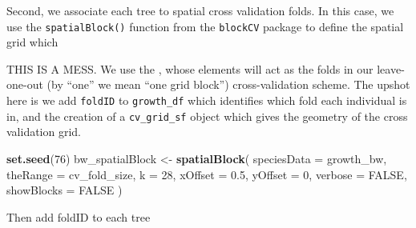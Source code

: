 \documentclass[12pt]{article}
\newenvironment{Shaded}{\begin{snugshade}}{\end{snugshade}}
\newcommand{\CommentTok}[1]{\textcolor[rgb]{0.56,0.35,0.01}{\textit{#1}}}
\newcommand{\DataTypeTok}[1]{\textcolor[rgb]{0.13,0.29,0.53}{#1}}
\newcommand{\DecValTok}[1]{\textcolor[rgb]{0.00,0.00,0.81}{#1}}
\newcommand{\FloatTok}[1]{\textcolor[rgb]{0.00,0.00,0.81}{#1}}
\newcommand{\KeywordTok}[1]{\textcolor[rgb]{0.13,0.29,0.53}{\textbf{#1}}}
\newcommand{\NormalTok}[1]{#1}
\newcommand{\OperatorTok}[1]{\textcolor[rgb]{0.81,0.36,0.00}{\textbf{#1}}}
\newcommand{\OtherTok}[1]{\textcolor[rgb]{0.56,0.35,0.01}{#1}}
\newcommand{\StringTok}[1]{\textcolor[rgb]{0.31,0.60,0.02}{#1}}
\begin{document}
Second, we associate each tree to spatial cross validation folds. In
this case, we use the \texttt{spatialBlock()} function from the
\texttt{blockCV} package to define the spatial grid which

THIS IS A MESS. We use the \citet{valavi_blockcv_2019}, whose elements
will act as the folds in our leave-one-out (by ``one'' we mean ``one
grid block'') cross-validation scheme. The upshot here is we add
\texttt{foldID} to \texttt{growth\_df} which identifies which fold each
individual is in, and the creation of a \texttt{cv\_grid\_sf} object
which gives the geometry of the cross validation grid.

\begin{Shaded}
\begin{Highlighting}[]
\KeywordTok{set.seed}\NormalTok{(}\DecValTok{76}\NormalTok{)}
\NormalTok{bw_spatialBlock <-}\StringTok{ }\KeywordTok{spatialBlock}\NormalTok{(}
  \DataTypeTok{speciesData =}\NormalTok{ growth_bw, }\DataTypeTok{theRange =}\NormalTok{ cv_fold_size, }\DataTypeTok{k =} \DecValTok{28}\NormalTok{, }\DataTypeTok{xOffset =} \FloatTok{0.5}\NormalTok{, }
  \DataTypeTok{yOffset =} \DecValTok{0}\NormalTok{, }\DataTypeTok{verbose =} \OtherTok{FALSE}\NormalTok{, }\DataTypeTok{showBlocks =} \OtherTok{FALSE}
\NormalTok{)}
\end{Highlighting}
\end{Shaded}

Then add foldID to each tree

\begin{Shaded}
\end{Shaded}

\begin{Shaded}
\end{Shaded}
\end{document}
